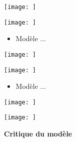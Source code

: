 \documentclass[a4paper,12pt]{article}
\begin{document}
\begin{center}
  \texttt{[image: ]}
  \end{center}
\begin{center}
  \texttt{[image: ]}
  \end{center}
\begin{itemize}
    \item Modèle ...
\end{itemize}


\begin{center}
  \texttt{[image: ]}
  \end{center}
\begin{center}
  \texttt{[image: ]}
  \end{center}
\begin{itemize}
    \item Modèle ...
\end{itemize}

\begin{center}
  \texttt{[image: ]}
  \end{center}
\begin{center}
  \texttt{[image: ]}
  \end{center}
\vspace{1cm}


\textbf{Critique du modèle}
\vspace{1cm}
\end{document}

